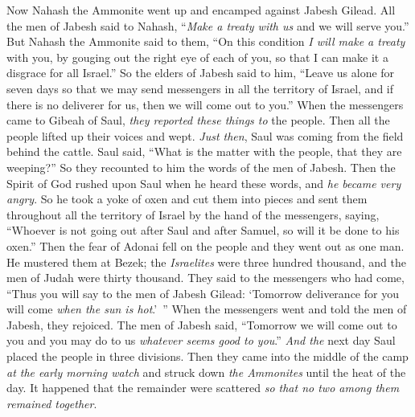 \begin{biblechapter} %
 Now Nahash the Ammonite went up and encamped against Jabesh Gilead. All the men of Jabesh said to Nahash, “\textit{Make a treaty with us} and we will serve you.”
\verse But Nahash the Ammonite said to them, “On this condition \textit{I will make a treaty} with you, by gouging out the right eye of each of you, so that I can make it a disgrace for all Israel.”
\verse So the elders of Jabesh said to him, “Leave us alone for seven days so that we may send messengers in all the territory of Israel, and if there is no deliverer for us, then we will come out to you.”
\verse When the messengers came to Gibeah of Saul, \textit{they reported these things to} the people. Then all the people lifted up their voices and wept.
\verse \textit{Just then}, Saul was coming from the field behind the cattle. Saul said, “What is the matter with the people, that they are weeping?” So they recounted to him the words of the men of Jabesh.
\verse Then the Spirit of God rushed upon Saul when he heard these words, and \textit{he became very angry}.
\verse So he took a yoke of oxen and cut them into pieces and sent them throughout all the territory of Israel by the hand of the messengers, saying, “Whoever is not going out after Saul and after Samuel, so will it be done to his oxen.” Then the fear of Adonai fell on the people and they went out as one man.
\verse He mustered them at Bezek; the \textit{Israelites} were three hundred thousand, and the men of Judah were thirty thousand.
\verse They said to the messengers who had come, “Thus you will say to the men of Jabesh Gilead: ‘Tomorrow deliverance for you will come \textit{when the sun is hot}.’ ” When the messengers went and told the men of Jabesh, they rejoiced.
\verse The men of Jabesh said, “Tomorrow we will come out to you and you may do to us \textit{whatever seems good to you}.”
\verse \textit{And the} next day Saul placed the people in three divisions. Then they came into the middle of the camp \textit{at the early morning watch} and struck down \textit{the Ammonites} until the heat of the day. It happened that the remainder were scattered \textit{so that no two among them remained together}.

\end{biblechapter}
